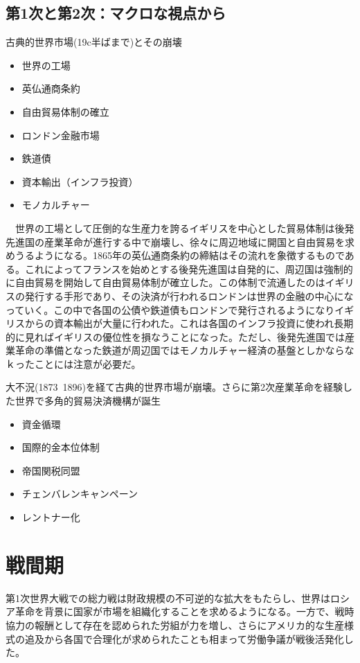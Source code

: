 \documentclass{jsarticle}
\begin{document}
\subsection{第1次と第2次：マクロな視点から}
古典的世界市場(19c半ばまで)とその崩壊
\begin{itemize}
\item 世界の工場
\item 英仏通商条約
\item 自由貿易体制の確立
\item ロンドン金融市場
\item 鉄道債
\item 資本輸出（インフラ投資）
\item モノカルチャー
\end{itemize}
　世界の工場として圧倒的な生産力を誇るイギリスを中心とした貿易体制は後発先進国の産業革命が進行する中で崩壊し、徐々に周辺地域に開国と自由貿易を求めうるようになる。1865年の英仏通商条約の締結はその流れを象徴するものである。これによってフランスを始めとする後発先進国は自発的に、周辺国は強制的に自由貿易を開始して自由貿易体制が確立した。この体制で流通したのはイギリスの発行する手形であり、その決済が行われるロンドンは世界の金融の中心になっていく。この中で各国の公債や鉄道債もロンドンで発行されるようになりイギリスからの資本輸出が大量に行われた。これは各国のインフラ投資に使われ長期的に見ればイギリスの優位性を損なうことになった。ただし、後発先進国では産業革命の準備となった鉄道が周辺国ではモノカルチャー経済の基盤としかならなｋったことには注意が必要だ。

大不況(1873~1896)を経て古典的世界市場が崩壊。さらに第2次産業革命を経験した世界で多角的貿易決済機構が誕生
\begin{itemize}
\item 資金循環
\item 国際的金本位体制
\item 帝国関税同盟
\item チェンバレンキャンペーン
\item レントナー化
\end{itemize}


\section{戦間期}
第1次世界大戦での総力戦は財政規模の不可逆的な拡大をもたらし、世界はロシア革命を背景に国家が市場を組織化することを求めるようになる。一方で、戦時協力の報酬として存在を認められた労組が力を増し、さらにアメリカ的な生産様式の追及から各国で合理化が求められたことも相まって労働争議が戦後活発化した。
\end{document}
